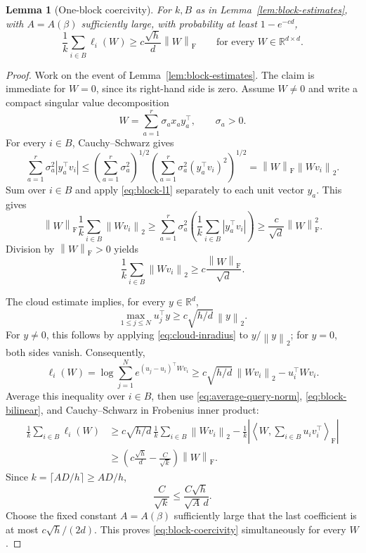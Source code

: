 \documentclass[11pt]{article}
\newtheorem{lemma}[theorem]{Lemma}
\theoremstyle{remark}
\newcommand{\R}{\mathbb R}
\newcommand{\ip}[2]{\left\langle #1,#2\right\rangle}
\newcommand{\norm}[1]{\left\lVert #1\right\rVert}
\newcommand{\F}{\mathrm{F}}
\newcommand{\1}{\mathbf 1}
\begin{document}
\begin{lemma}[One-block coercivity]
\label{lem:block-coercivity}
For $k,B$ as in Lemma~\ref{lem:block-estimates}, with $A=A(\beta)$ sufficiently
large, with probability at least $1-e^{-cd}$,
\begin{equation}
 \frac1k\sum_{i\in B}\ell_i(W)
 \geq c\frac{\sqrt h}{d}\norm W_{\F}
 \qquad\text{for every }W\in\R^{d\times d}.
 \label{eq:block-coercivity}
\end{equation}
\end{lemma}

\begin{proof}
Work on the event of Lemma~\ref{lem:block-estimates}.  The claim is
immediate for $W=0$, since its right-hand side is zero.  Assume
$W\neq0$ and write a compact singular value decomposition
\[
 W=\sum_{a=1}^r\sigma_ax_ay_a^\top,
 \qquad \sigma_a>0.
\]
For every $i\in B$, Cauchy--Schwarz gives
\[
 \sum_{a=1}^r\sigma_a^2|y_a^\top v_i|
 \leq
 \left(\sum_{a=1}^r\sigma_a^2\right)^{1/2}
 \left(\sum_{a=1}^r\sigma_a^2(y_a^\top v_i)^2\right)^{1/2}
 =\norm W_{\F}\norm{Wv_i}_2.
\]
Sum over $i\in B$ and apply \eqref{eq:block-l1} separately to each
unit vector $y_a$.  This gives
\[
 \norm W_{\F}\frac1k\sum_{i\in B}\norm{Wv_i}_2
 \geq
 \sum_{a=1}^r\sigma_a^2
 \left(\frac1k\sum_{i\in B}|y_a^\top v_i|\right)
 \geq\frac c{\sqrt d}\norm W_{\F}^2.
\]
Division by $\norm W_{\F}>0$ yields
\begin{equation}
 \frac1k\sum_{i\in B}\norm{Wv_i}_2
 \geq c\frac{\norm W_{\F}}{\sqrt d}.
 \label{eq:average-query-norm}
\end{equation}

The cloud estimate implies, for every $y\in\R^d$,
\[
 \max_{1\leq j\leq N}u_j^\top y
 \geq c\sqrt{h/d}\,\norm y_2.
\]
For $y\neq0$, this follows by applying \eqref{eq:cloud-inradius} to
$y/\norm y_2$; for $y=0$, both sides vanish.  Consequently,
\[
 \ell_i(W)
 =\log\sum_{j=1}^N e^{(u_j-u_i)^\top Wv_i}
 \geq c\sqrt{h/d}\,\norm{Wv_i}_2-u_i^\top Wv_i.
\]
Average this inequality over $i\in B$, then use
\eqref{eq:average-query-norm}, \eqref{eq:block-bilinear}, and
Cauchy--Schwarz in Frobenius inner product:
\begin{align*}
 \frac1k\sum_{i\in B}\ell_i(W)
 &\geq c\sqrt{h/d}\,\frac1k\sum_{i\in B}\norm{Wv_i}_2
 -\frac1k\left|\ip{W}{\sum_{i\in B}u_iv_i^\top}_{\F}\right|\\
 &\geq\left(c\frac{\sqrt h}{d}-\frac C{\sqrt k}\right)\norm W_{\F}.
\end{align*}
Since $k=\lceil AD/h\rceil\geq AD/h$,
\[
 \frac C{\sqrt k}\leq\frac{C\sqrt h}{\sqrt A\,d}.
\]
Choose the fixed constant $A=A(\beta)$ sufficiently large that the
last coefficient is at most $c\sqrt h/(2d)$.  This proves
\eqref{eq:block-coercivity} simultaneously for every $W$.
\end{proof}
\end{document}
